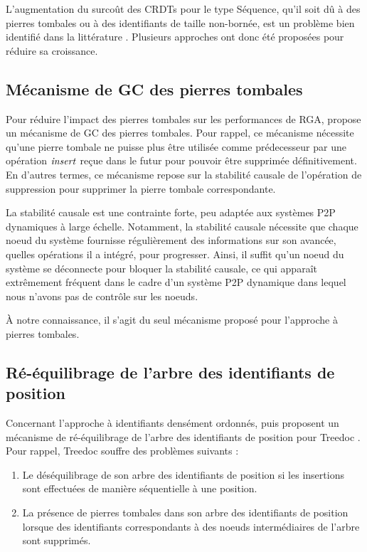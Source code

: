 L'augmentation du surcoût des \acp{CRDT} pour le type Séquence, qu'il soit dû à des pierres tombales ou à des identifiants de taille non-bornée, est un problème bien identifié dans la littérature \cite{ROH2011354,2009-treedoc-preguica,letia:hal-01248270,zawirski:hal-01248197,lseq2013,lseq2017}.
Plusieurs approches ont donc été proposées pour réduire sa croissance.

\subsection{Mécanisme de \acl{GC} des pierres tombales}

Pour réduire l'impact des pierres tombales sur les performances de \ac{RGA}, \cite{ROH2011354} propose un mécanisme de \acf{GC} des pierres tombales.
Pour rappel, ce mécanisme nécessite qu'une pierre tombale ne puisse plus être utilisée comme prédecesseur par une opération $\mathit{insert}$ reçue dans le futur pour pouvoir être supprimée définitivement.
En d'autres termes, ce mécanisme repose sur la stabilité causale de l'opération de suppression pour supprimer la pierre tombale correspondante.

La stabilité causale est une contrainte forte, peu adaptée aux systèmes \ac{P2P} dynamiques à large échelle.
Notamment, la stabilité causale nécessite que chaque noeud du système fournisse régulièrement des informations sur son avancée, \ie quelles opérations il a intégré, pour progresser.
Ainsi, il suffit qu'un noeud du système se déconnecte pour bloquer la stabilité causale, ce qui apparaît extrêmement fréquent dans le cadre d'un système \ac{P2P} dynamique dans lequel nous n'avons pas de contrôle sur les noeuds.

À notre connaissance, il s'agit du seul mécanisme proposé pour l'approche à pierres tombales.

\subsection{Ré-équilibrage de l'arbre des identifiants de position}
\label{sec:etat-art-core-nebula}

Concernant l'approche à identifiants densément ordonnés, \textcite{letia:hal-01248270} puis \textcite{zawirski:hal-01248197} proposent un mécanisme de ré-équilibrage de l'arbre des identifiants de position pour Treedoc \cite{2009-treedoc-preguica}.
Pour rappel, Treedoc souffre des problèmes suivants :
\begin{enumerate}
    \item Le déséquilibrage de son arbre des identifiants de position si les insertions sont effectuées de manière séquentielle à une position.
    \item La présence de pierres tombales dans son arbre des identifiants de position lorsque des identifiants correspondants à des noeuds intermédiaires de l'arbre sont supprimés.
\end{enumerate}


